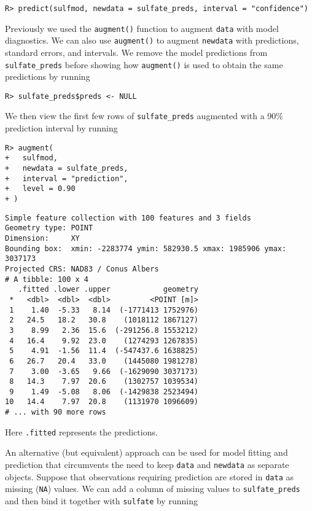 \documentclass[10pt,letterpaper]{article}
\begin{document}
\begin{verbatim}
R> predict(sulfmod, newdata = sulfate_preds, interval = "confidence")
\end{verbatim}

Previously we used the \texttt{augment()} function to augment
\texttt{data} with model diagnostics. We can also use \texttt{augment()}
to augment \texttt{newdata} with predictions, standard errors, and
intervals. We remove the model predictions from \texttt{sulfate\_preds}
before showing how \texttt{augment()} is used to obtain the same
predictions by running

\begin{verbatim}
R> sulfate_preds$preds <- NULL
\end{verbatim}

We then view the first few rows of \texttt{sulfate\_preds} augmented
with a 90\% prediction interval by running

\begin{verbatim}
R> augment(
+   sulfmod,
+   newdata = sulfate_preds,
+   interval = "prediction",
+   level = 0.90
+ )
\end{verbatim}

\begin{verbatim}
Simple feature collection with 100 features and 3 fields
Geometry type: POINT
Dimension:     XY
Bounding box:  xmin: -2283774 ymin: 582930.5 xmax: 1985906 ymax: 3037173
Projected CRS: NAD83 / Conus Albers
# A tibble: 100 x 4
   .fitted .lower .upper            geometry
 *   <dbl>  <dbl>  <dbl>         <POINT [m]>
 1    1.40  -5.33   8.14  (-1771413 1752976)
 2   24.5   18.2   30.8    (1018112 1867127)
 3    8.99   2.36  15.6  (-291256.8 1553212)
 4   16.4    9.92  23.0    (1274293 1267835)
 5    4.91  -1.56  11.4  (-547437.6 1638825)
 6   26.7   20.4   33.0    (1445080 1981278)
 7    3.00  -3.65   9.66  (-1629090 3037173)
 8   14.3    7.97  20.6    (1302757 1039534)
 9    1.49  -5.08   8.06  (-1429838 2523494)
10   14.4    7.97  20.8    (1131970 1096609)
# ... with 90 more rows
\end{verbatim}

Here \texttt{.fitted} represents the predictions.

An alternative (but equivalent) approach can be used for model fitting
and prediction that circumvents the need to keep \texttt{data} and
\texttt{newdata} as separate objects. Suppose that observations
requiring prediction are stored in \texttt{data} as missing
(\texttt{NA}) values. We can add a column of missing values to
\texttt{sulfate\_preds} and then bind it together with \texttt{sulfate}
by running
\end{document}
